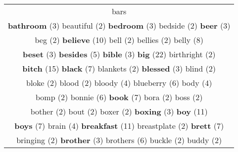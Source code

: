 \documentclass[12pt,a4paper]{article}
\begin{document}
\begin{center}
\begin{longtable}{|c|}
\textcolor{VerdeLocao} {bars}} \footnotesize{(4)}  \\ {\small \textcolor{Laranja} {\bf bathroom}} \footnotesize{(3)} {\footnotesize \textcolor{Verde} {beautiful}} \footnotesize{(2)} {\small \textcolor{Laranja} {\bf bedroom}} \footnotesize{(3)} {\footnotesize \textcolor{Verde} {bedside}} \footnotesize{(2)} {\small \textcolor{Laranja} {\bf beer}} \footnotesize{(3)}  \\ {\footnotesize \textcolor{Verde} {beg}} \footnotesize{(2)} {\Huge \textcolor{AzulEscuro} {\bf believe}} \footnotesize{(10)} {\footnotesize \textcolor{Verde} {bell}} \footnotesize{(2)} {\footnotesize \textcolor{Verde} {bellies}} \footnotesize{(2)} {\huge \textcolor{Amarelo} {belly}} \footnotesize{(8)}  \\ {\small \textcolor{Laranja} {\bf beset}} \footnotesize{(3)} {\large \textcolor{Roxo} {\bf besides}} \footnotesize{(5)} {\small \textcolor{Laranja} {\bf bible}} \footnotesize{(3)} {\Huge \textcolor{AzulEscuro} {\bf big}} \footnotesize{(22)} {\footnotesize \textcolor{Verde} {birthright}} \footnotesize{(2)}  \\ {\Huge \textcolor{AzulEscuro} {\bf bitch}} \footnotesize{(15)} {\LARGE \textcolor{Rosa} {\bf black}} \footnotesize{(7)} {\footnotesize \textcolor{Verde} {blankets}} \footnotesize{(2)} {\small \textcolor{Laranja} {\bf blessed}} \footnotesize{(3)} {\footnotesize \textcolor{Verde} {blind}} \footnotesize{(2)}  \\ {\footnotesize \textcolor{Verde} {bloke}} \footnotesize{(2)} {\footnotesize \textcolor{Verde} {blood}} \footnotesize{(2)} {\normalsize \textcolor{VerdeLocao} {bloody}} \footnotesize{(4)} {\Large \textcolor{VermEscuro} {blueberry}} \footnotesize{(6)} {\normalsize \textcolor{VerdeLocao} {body}} \footnotesize{(4)}  \\ {\footnotesize \textcolor{Verde} {bomp}} \footnotesize{(2)} {\Large \textcolor{VermEscuro} {bonnie}} \footnotesize{(6)} {\LARGE \textcolor{Rosa} {\bf book}} \footnotesize{(7)} {\footnotesize \textcolor{Verde} {bora}} \footnotesize{(2)} {\footnotesize \textcolor{Verde} {boss}} \footnotesize{(2)}  \\ {\footnotesize \textcolor{Verde} {bother}} \footnotesize{(2)} {\footnotesize \textcolor{Verde} {bout}} \footnotesize{(2)} {\footnotesize \textcolor{Verde} {boxer}} \footnotesize{(2)} {\small \textcolor{Laranja} {\bf boxing}} \footnotesize{(3)} {\Huge \textcolor{AzulEscuro} {\bf boy}} \footnotesize{(11)}  \\ {\LARGE \textcolor{Rosa} {\bf boys}} \footnotesize{(7)} {\normalsize \textcolor{VerdeLocao} {brain}} \footnotesize{(4)} {\Huge \textcolor{AzulEscuro} {\bf breakfast}} \footnotesize{(11)} {\footnotesize \textcolor{Verde} {breastplate}} \footnotesize{(2)} {\LARGE \textcolor{Rosa} {\bf brett}} \footnotesize{(7)}  \\ {\footnotesize \textcolor{Verde} {bringing}} \footnotesize{(2)} {\small \textcolor{Laranja} {\bf brother}} \footnotesize{(3)} {\Large \textcolor{VermEscuro} {brothers}} \footnotesize{(6)} {\footnotesize \textcolor{Verde} {buckle}} \footnotesize{(2)} {\footnotesize \textcolor{Verde} {buddy}} \footnotesize{(2)}  \\ 
\end{longtable}
\end{center}
\end{document}
